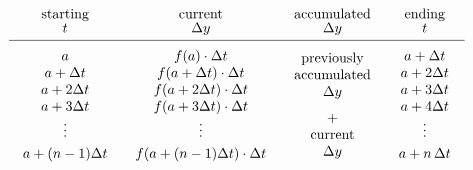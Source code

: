 {\small
        \[
\begin{array}{cccc}
        \mbox{starting} & \mbox{current} & \mbox{accumulated} &
                \mbox{ending} \\ [-2pt]
        t & \Delta y &  \Delta y & t \\[2pt] \hline
        \begin{array}{c}
                \rule{0pt}{14pt} a \rule{0pt}{14pt} \\
                a + \Delta t \\
                a + 2\Delta t \\
                a + 3\Delta t \\
                \vdots \\[3pt]
                a + (n-1)\Delta t 
        \end{array}
        &
        \begin{array}{c}
                \rule{0pt}{14pt} f(a) \cdot \Delta t \\
                f(a + \Delta t) \cdot \Delta t  \\
                f(a + 2\Delta t) \cdot \Delta t  \\
                f(a + 3\Delta t) \cdot \Delta t  \\
                \vdots \\[3pt]
                f(a + (n-1)\Delta t) \cdot \Delta t  
        \end{array}
        &
        \begin{array}{c}
                \rule{0pt}{14pt} \mbox{previously}
                        \rule{0pt}{14pt}\\
                \mbox{accumulated} \\
                \Delta y \\
                \vphantom{\vdots} + \vphantom{\vdots} \\
                \mbox{current} \\
                \Delta y
        \end{array}
        &
        \begin{array}{c}
                \rule{0pt}{14pt} a + \Delta t \rule{0pt}{14pt} \\
                a + 2\Delta t \\
                a + 3\Delta t \\
                a + 4\Delta t \\
                \vdots \\[3pt]
                a + n\,\Delta t 
        \end{array}
\end{array}
\]
}


